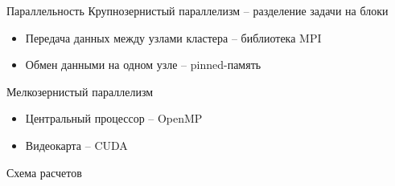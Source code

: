 \documentclass{beamer}
\begin{document}
\begin{frame}{Параллельность}
		Крупнозернистый параллелизм -- разделение задачи на блоки
		\begin{itemize}
			\item Передача данных между узлами кластера -- библиотека MPI
			\item Обмен данными на одном узле -- pinned-память
		\end{itemize}

		\vspace{0.7cm}		
		
		Мелкозернистый параллелизм
		\begin{itemize}
			\item Центральный процессор -- OpenMP
			\item Видеокарта -- CUDA
		\end{itemize}
\end{frame}






\begin{frame}{Схема расчетов}
	\begin{figure}[h]
		\label{ris:scheme}
	\end{figure}
\end{frame}
\end{document}
